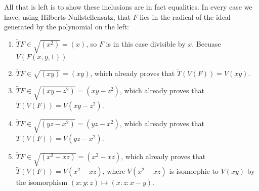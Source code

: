 \begin{exercise}{2}
\begin{enumerate}
            All that is left is to show these inclusions are in fact equalities.
            In every case we have, using Hilberts Nullstellensatz, that $F$
            lies in the radical of the ideal generated by the polynomial on the
            left:
            \begin{enumerate}
                \item{} $\widetilde{T}F \in \sqrt{(x^2)} = (x)$, so $F$ is in
                    this case divisible by $x$. Becuase $V(F(x, y, 1))$
                \item{} $\widetilde{T}F \in \sqrt{(xy)} = (xy)$, which already
                    proves that $\widetilde{T}(V(F)) = V(xy)$.
                \item{} $\widetilde{T}F \in \sqrt{(xy - z^2)} = (xy - z^2)$, which already
                    proves that $\widetilde{T}(V(F)) = V(xy - z^2)$.
                \item{} $\widetilde{T}F \in \sqrt{(yz - x^2)} = (yz - x^2)$, which already
                    proves that $\widetilde{T}(V(F)) = V(yz - x^2)$.
                \item{} $\widetilde{T}F \in \sqrt{(x^2 - xz)} = (x^2 - xz)$, which already
                    proves that $\widetilde{T}(V(F)) = V(x^2 - xz)$, where
                    $V(x^2 - xz)$ is isomorphic to $V(xy)$ by the isomorphism
                    $(x : y : z) \mapsto (x : z : x - y)$.
            \end{enumerate}

    \end{enumerate}
\end{exercise}

